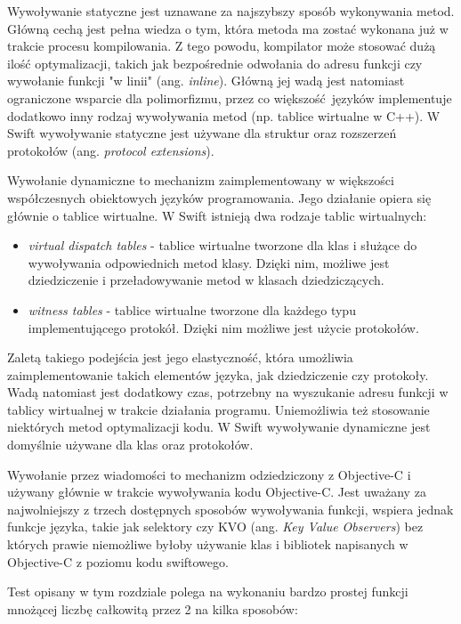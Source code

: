 \documentclass[mgr, shortabstract]{iithesis}
\newcommand{\ang}[1]{ang. \textit{#1}}
\begin{document}
Wywoływanie statyczne jest uznawane za najszybszy sposób wykonywania metod. Główną cechą jest pełna wiedza o tym, która metoda ma zostać wykonana już w trakcie procesu kompilowania. Z tego powodu, kompilator może stosować dużą ilość optymalizacji, takich jak bezpośrednie odwołania do adresu funkcji czy wywołanie funkcji "w linii" (\ang{inline}). Główną jej wadą jest natomiast ograniczone wsparcie dla polimorfizmu, przez co większość języków implementuje dodatkowo inny rodzaj wywoływania metod (np. tablice wirtualne w C++). W Swift wywoływanie statyczne jest używane dla struktur oraz rozszerzeń protokołów (\ang{protocol extensions}).

Wywołanie dynamiczne to mechanizm zaimplementowany w większości współczesnych obiektowych języków programowania. Jego działanie opiera się głównie o tablice wirtualne. W Swift istnieją dwa rodzaje tablic wirtualnych:

\begin{itemize}
    \item \textit{virtual dispatch tables} - tablice wirtualne tworzone dla klas i służące do wywoływania odpowiednich metod klasy. Dzięki nim, możliwe jest dziedziczenie i przeładowywanie metod w klasach dziedziczących.
    \item \textit{witness tables} - tablice wirtualne tworzone dla każdego typu implementującego protokół. Dzięki nim możliwe jest użycie protokołów.
\end{itemize}

Zaletą takiego podejścia jest jego elastyczność, która umożliwia zaimplementowanie takich elementów języka, jak dziedziczenie czy protokoły. Wadą natomiast jest dodatkowy czas, potrzebny na wyszukanie adresu funkcji w tablicy wirtualnej w trakcie działania programu. Uniemożliwia też stosowanie niektórych metod optymalizacji kodu. W Swift wywoływanie dynamiczne jest domyślnie używane dla klas oraz protokołów.

Wywołanie przez wiadomości to mechanizm odziedziczony z Objective-C i używany głównie w trakcie wywoływania kodu Objective-C. Jest uważany za najwolniejszy z trzech dostępnych sposobów wywoływania funkcji, wspiera jednak funkcje języka, takie jak selektory czy KVO (\ang{Key Value Observers}) bez których prawie niemożliwe byłoby używanie klas i bibliotek napisanych w Objective-C z poziomu kodu swiftowego.

Test opisany w tym rozdziale polega na wykonaniu bardzo prostej funkcji mnożącej liczbę całkowitą przez 2 na kilka sposobów:
\end{document}
